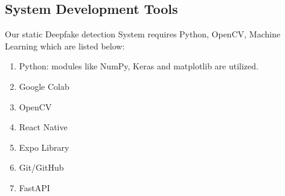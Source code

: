 \subsection{System Development Tools}
Our static Deepfake detection System requires Python, OpenCV,
Machine Learning which are listed below:
\begin{enumerate}
    \item Python: modules like NumPy, Keras and matplotlib are utilized.
    \item Google Colab
    \item OpenCV
    \item React Native
    \item Expo Library
    \item Git/GitHub
    \item FastAPI
\end{enumerate}


